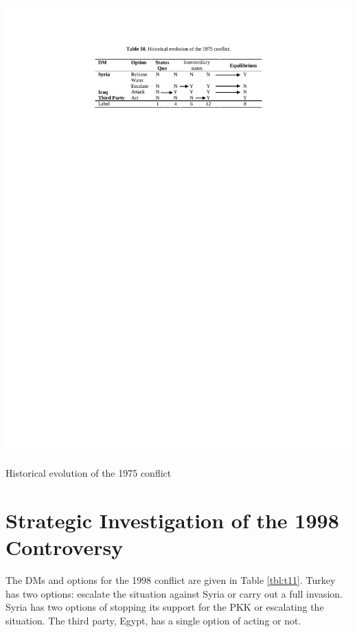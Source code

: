 \documentclass[letterpaper,12pt,titlepage,oneside,final]{book}
\begin{document}
\begin{table}[H]
\centering
\includegraphics[scale=1]{PDF-IMG/tables/10.pdf}

\caption{Historical evolution of the 1975 conflict}

\label{tbl:t10}
\end{table}

\section{Strategic Investigation of the 1998 Controversy}
The DMs and options for the 1998 conflict are given in Table \ref{tbl:t11}. Turkey has two options: escalate the situation against Syria or carry out a full invasion. Syria has two options of stopping its support for the PKK or escalating the situation. The third party, Egypt, has a single option of acting or not.
\end{document}
